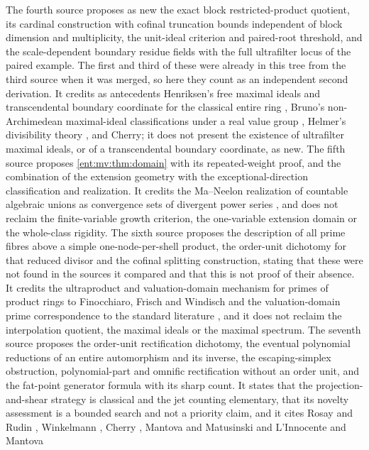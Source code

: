 \documentclass[11pt]{article}
\theoremstyle{plain}
\theoremstyle{plain}
\theoremstyle{plain}
\theoremstyle{definition}
\theoremstyle{definition}
\theoremstyle{definition}
\theoremstyle{definition}
\theoremstyle{remark}
\begin{document}
The fourth source proposes as new the exact block restricted-product
quotient, its cardinal construction with cofinal truncation bounds
independent of block dimension and multiplicity, the unit-ideal criterion and
paired-root threshold, and the scale-dependent boundary residue fields with
the full ultrafilter locus of the paired example. The first and third of
these were already in this tree from the third source when it was merged, so
here they count as an independent second derivation. It credits as
antecedents Henriksen's free maximal ideals and transcendental boundary
coordinate for the classical entire ring \cite{Henriksen}, Bruno's
non-Archimedean maximal-ideal classifications under a real value group
\cite{Bruno}, Helmer's divisibility theory \cite{Helmer}, and Cherry; it does
not present the existence of ultrafilter maximal ideals, or of a
transcendental boundary coordinate, as new. The fifth source proposes
\cref{ent:mv:thm:domain} with its repeated-weight proof, and the combination
of the extension geometry with the exceptional-direction classification and
realization. It credits the Ma--Neelon realization of countable algebraic
unions as convergence sets of divergent power series \cite{MaNeelon}, and
does not reclaim the finite-variable growth criterion, the one-variable
extension domain or the whole-class rigidity. The sixth source proposes the
description of all prime fibres above a simple one-node-per-shell product,
the order-unit dichotomy for that reduced divisor and the cofinal splitting
construction, stating that these were not found in the sources it compared
and that this is not proof of their absence. It credits the ultraproduct and
valuation-domain mechanism for primes of product rings to Finocchiaro,
Frisch and Windisch \cite{FFW} and the valuation-domain prime correspondence
to the standard literature \cite{StacksValuation}, and it does not reclaim
the interpolation quotient, the maximal ideals or the maximal spectrum.
The seventh source proposes the order-unit rectification dichotomy, the
eventual polynomial reductions of an entire automorphism and its inverse, the
escaping-simplex obstruction, polynomial-part and omnific rectification
without an order unit, and the fat-point generator formula with its sharp
count. It states that the projection-and-shear strategy is classical and the
jet counting elementary, that its novelty assessment is a bounded search and
not a priority claim, and it cites Rosay and Rudin \cite{RosayRudin},
Winkelmann \cite{Winkelmann}, Cherry \cite{CherryLectures},
Mantova and Matusinski \cite{MantovaMatusinski} and L'Innocente and Mantova
\end{document}
